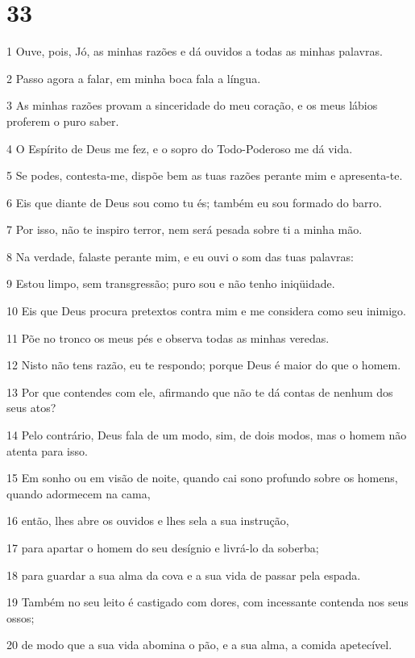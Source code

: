 \chapter{33}

\par 1 Ouve, pois, Jó, as minhas razões e dá ouvidos a todas as minhas palavras.
\par 2 Passo agora a falar, em minha boca fala a língua.
\par 3 As minhas razões provam a sinceridade do meu coração, e os meus lábios proferem o puro saber.
\par 4 O Espírito de Deus me fez, e o sopro do Todo-Poderoso me dá vida.
\par 5 Se podes, contesta-me, dispõe bem as tuas razões perante mim e apresenta-te.
\par 6 Eis que diante de Deus sou como tu és; também eu sou formado do barro.
\par 7 Por isso, não te inspiro terror, nem será pesada sobre ti a minha mão.
\par 8 Na verdade, falaste perante mim, e eu ouvi o som das tuas palavras:
\par 9 Estou limpo, sem transgressão; puro sou e não tenho iniqüidade.
\par 10 Eis que Deus procura pretextos contra mim e me considera como seu inimigo.
\par 11 Põe no tronco os meus pés e observa todas as minhas veredas.
\par 12 Nisto não tens razão, eu te respondo; porque Deus é maior do que o homem.
\par 13 Por que contendes com ele, afirmando que não te dá contas de nenhum dos seus atos?
\par 14 Pelo contrário, Deus fala de um modo, sim, de dois modos, mas o homem não atenta para isso.
\par 15 Em sonho ou em visão de noite, quando cai sono profundo sobre os homens, quando adormecem na cama,
\par 16 então, lhes abre os ouvidos e lhes sela a sua instrução,
\par 17 para apartar o homem do seu desígnio e livrá-lo da soberba;
\par 18 para guardar a sua alma da cova e a sua vida de passar pela espada.
\par 19 Também no seu leito é castigado com dores, com incessante contenda nos seus ossos;
\par 20 de modo que a sua vida abomina o pão, e a sua alma, a comida apetecível.
